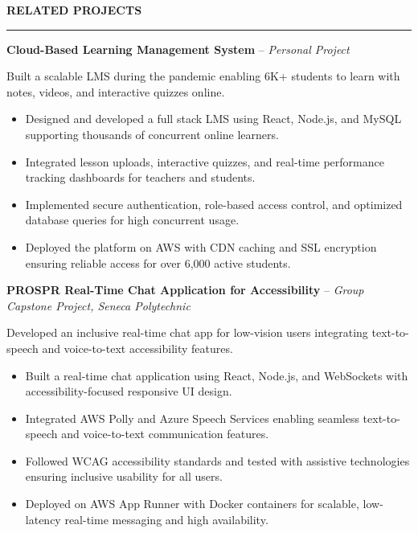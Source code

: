 \documentclass[10pt,letterpaper]{article}
\begin{document}
\vspace{6pt}

\textbf{RELATED PROJECTS}\\[-8pt]
\noindent\rule{\textwidth}{1pt}

\vspace{-2pt}

\textbf{Cloud-Based Learning Management System} -- \emph{Personal Project}

\vspace{-1pt}

Built a scalable LMS during the pandemic enabling 6K+ students to learn with notes, videos, and interactive quizzes online.
\vspace{-1pt}
\begin{itemize}
\item Designed and developed a full stack LMS using React, Node.js, and MySQL supporting thousands of concurrent online learners.
\item Integrated lesson uploads, interactive quizzes, and real-time performance tracking dashboards for teachers and students.
\item Implemented secure authentication, role-based access control, and optimized database queries for high concurrent usage.
\item Deployed the platform on AWS with CDN caching and SSL encryption ensuring reliable access for over 6,000 active students.
\end{itemize}

\textbf{PROSPR  Real-Time Chat Application for Accessibility} -- \emph{Group Capstone Project, Seneca Polytechnic}

\vspace{-1pt}

Developed an inclusive real-time chat app for low-vision users integrating text-to-speech and voice-to-text accessibility features.
\vspace{-1pt}
\begin{itemize}
\item Built a real-time chat application using React, Node.js, and WebSockets with accessibility-focused responsive UI design.
\item Integrated AWS Polly and Azure Speech Services enabling seamless text-to-speech and voice-to-text communication features.
\item Followed WCAG accessibility standards and tested with assistive technologies ensuring inclusive usability for all users.
\item Deployed on AWS App Runner with Docker containers for scalable, low-latency real-time messaging and high availability.
\end{itemize}
\end{document}
